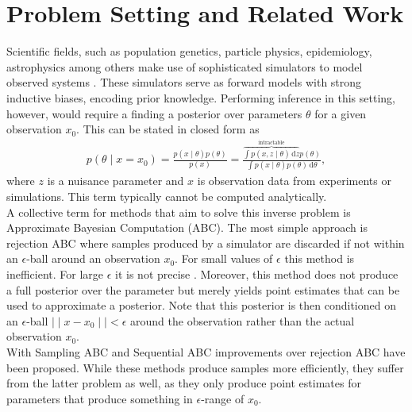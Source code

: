 \documentclass[12pt]{article}
\title{\vskip-3em \bf 
	Simulation-based Inference
    }
\author{
    A Summary Written by Stefan Wezel \\
    \texttt{stefan.wezel@student.uni-tuebingen.de}
}
\date{\it Machine Learning for and with Dynamical Systems\\Summer Term 2021}
\newcommand{\diff}{\,\text{d}}
\begin{document}
\maketitle



\section*{Problem Setting and Related Work}
Scientific fields, such as population genetics, particle physics, epidemiology, astrophysics among others make use of sophisticated simulators to model observed systems \citep{brehmer2020simulation, de2020simulation, delaunoy2020lightning,cranmer2020frontier, pritchard1999population}. These simulators serve as forward models with strong inductive biases, encoding prior knowledge. Performing inference in this setting, however, would require a finding a posterior over parameters $\theta$ for a given observation $x_0$. This can be stated in closed form as 
\begin{align}
	p(\theta\mid x=x_0) = \frac{p(x\mid \theta)p(\theta)}{p(x)} = \frac{\overbrace{\int p(x,z\mid \theta)\diff z}^{\text{intractable}} p(\theta)}{\int p(x\mid \theta)p(\theta) \diff \theta},
\end{align}
where $z$ is a nuisance parameter and $x$ is observation data from experiments or simulations. This term typically cannot be computed analytically.\\
A collective term for methods that aim to solve this inverse problem is Approximate Bayesian Computation (ABC). The most simple approach is rejection ABC \citep{pritchard1999population} where samples produced by a simulator are discarded if not within an $\epsilon$-ball around an observation $x_0$. For small values of $\epsilon$ this method is inefficient. For large $\epsilon$ it is not precise \citep{papamakarios2016fast}. Moreover, this method does not produce a full posterior over the parameter but merely yields point estimates that can be used to approximate a posterior. Note that this posterior is then conditioned on an $\epsilon$-ball $\mid\mid x-x_0 \mid\mid < \epsilon$ around the observation rather than the actual observation $x_0$.\\
With Sampling ABC \citep{marjoram2003markov} and Sequential ABC \citep{beaumont2009adaptive,bonassi2015sequential} improvements over rejection ABC have been proposed. While these methods produce samples more efficiently, they suffer from the latter problem as well, as they only produce point estimates for parameters that produce something in $\epsilon$-range of $x_0$.
\end{document}
